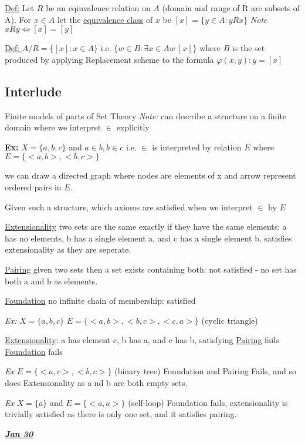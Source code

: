 \documentclass{article}
\begin{document}
    \underline{Def:} Let $R$ be an eqiuvalence relation on $A$ (domain and range of R are subsets of A).
    For $x \in A$ let the \underline{equivalence class} of $x$ be $[x] = \{y \in A : y R x\}$
    \emph{Note } $x R y \iff [x] = [y]$

    \underline{Def: } $A/R = \{[x] : x \in A\}$
    i.e. $\{w \in B : \exists x \in A w \ [x]\}$
    where $B$ is the set produced by applying Replacement scheme to the formula $\varphi(x,y) : y=[x]$

    \subsection{Interlude}
    Finite models of parts of Set Theory
    \emph{Note:} can describe a structure on a finite domain where we interpret $\in$ explicitly

    \textbf{Ex:} $X = \{a,b,c\}$ and $a \in b, b \in c$
    i.e. $\in$ is interpreted by relation $E$ where $E = \{ <a,b> , <b,c>\}$

    we can draw a directed graph where nodes are elements of x and arrow represent ordered pairs in $E$.

    Given such a structure, which axioms are satisfied when we interpret $\in$ by $E$

    \underline{Extensionality} two sets are the same exactly if they have the same elements:
    a has no elements, b has a single element a, and c has a single element b.
    satisfies extensionality as they are seperate.

    \underline{Pairing} given two sets then a set exists containing both:
    not satisfied - no set has both a and b as elements.

    \underline{Foundation} no infinite chain of membership:
    satisfied

    \emph{Ex:} $X = \{a,b,c\}$
    $E = \{<a,b>,<b,c>,<c,a>\}$
    (cyclic triangle)

    \underline{Extensionality}: a has element c, b has a, and c has b, satisfying
    \underline{Pairing} fails
    \underline{Foundation} fails

    \emph{Ex} $E =\{<a,c>,<b,c>\}$ (binary tree)
    Foundation and Pairing Fails, and so does Extensionality as a nd b are both empty sets.

    \emph{Ex} $X=\{a\}$ and $E=\{<a,a>\}$ (self-loop)
    Foundation fails, extensionality is trivially satisfied as there is only one set, and it satisfies pairing.

   \emph{\underline{\textbf{Jan 30}}}
\end{document}
